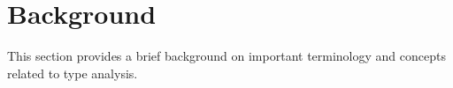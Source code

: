 
\section{Background}

This section provides a brief background on important terminology and concepts related to type analysis.







